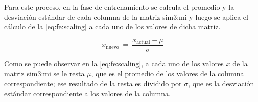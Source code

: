 Para este proceso, en la fase de entrenamiento se calcula el promedio
y la desviación estándar de cada columna de la matriz \gls{sim3:mi}
y luego se aplica el cálculo de la \autoref{eq:fe:scaling} a cada uno
de los valores de dicha matriz.

\begin{equation}
    \label{eq:fe:scaling}
    x_{\text{nuevo}}
    \ = \
    \frac
        {x_{\text{actual}} - \mu}
        {\sigma}
\end{equation}

Como se puede observar en la \autoref{eq:fe:scaling}, a cada uno de los
valores $x$ de la matriz \gls{sim3:mi} se le resta $\mu$, que es el
promedio de los valores de la columna correspondiente; ese resultado
de la resta es dividido por $\sigma$, que es la desviación estándar
correspondiente a los valores de la columna.

